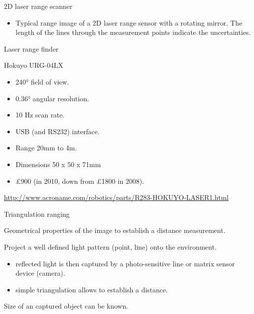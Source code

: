 \documentclass[compress]{beamer}
\begin{document}
\begin{frame}{2D laser range scanner}

\begin{itemize}

\item
  Typical range image of a 2D laser range sensor with a rotating mirror.
  The length of the lines through the measurement points indicate the
  uncertainties.
\end{itemize}

\end{frame}

\begin{frame}{Laser range finder}

Hokuyo URG-04LX

\begin{itemize}

\item
  240° field of view.
\item
  0.36° angular resolution.
\item
  10 Hz scan rate.
\item
  USB (and RS232) interface.
\item
  Range 20mm to 4m.
\item
  Dimensions 50 x 50 x 71mm
\item
  £900 (in 2010, down from £1800 in 2008).
\end{itemize}

\url{http://www.acroname.com/robotics/parts/R283-HOKUYO-LASER1.html}

\end{frame}

\begin{frame}{Triangulation ranging}

Geometrical properties of the image to establish a distance measurement.

Project a well defined light pattern (\eg point, line) onto the
environment.

\begin{itemize}

\item
  reflected light is then captured by a photo-sensitive line or matrix
  sensor device (camera).
\item
  simple triangulation allows to establish a distance.
\end{itemize}

Size of an captured object can be known.

\end{frame}
\end{document}
